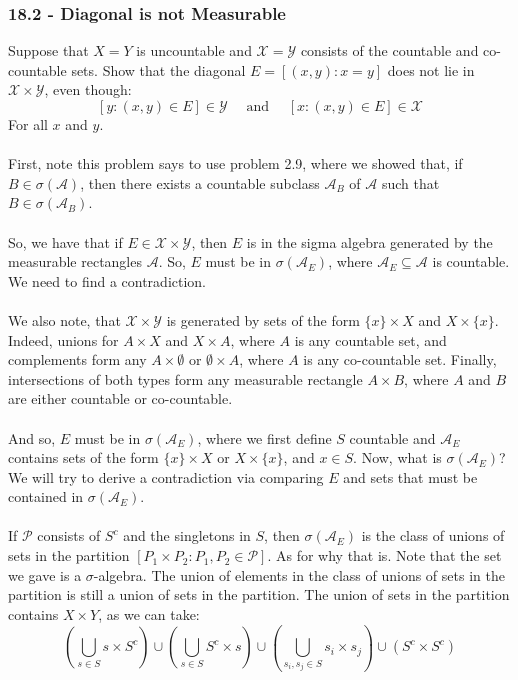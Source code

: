 \documentclass[12pt,a4paper]{article}
\newcommand{\1}[1]{\mathbbm{1}\left\{ #1 \right\}}
\newcommand{\acal}{\mathcal{A}}
\newcommand{\pcal}{\mathcal{P}}
\newcommand{\xcal}{\mathcal{X}}
\newcommand{\ycal}{\mathcal{Y}}
\begin{document}
\subsubsection{18.2 - Diagonal is not Measurable} Suppose that $X = Y$ is uncountable and $\xcal = \ycal$ consists of the countable and co-countable sets. Show that the diagonal $E = [(x,y) : x = y]$ does not lie in $\xcal \times \ycal$, even though:
$$
	[y : (x,y) \in E] \in \ycal
	\quad\text{ and }\quad
	[x : (x,y) \in E] \in \xcal
$$
For all $x$ and $y$.
\\\\
First, note this problem says to use problem 2.9, where we showed that, if $B \in \sigma(\acal)$, then there exists a countable subclass $\acal_B$ of $\acal$ such that $B \in \sigma(\acal_B)$.
\\\\
So, we have that if $E \in \xcal \times \ycal$, then $E$ is in the sigma algebra generated by the measurable rectangles $\acal$. So, $E$ must be in $\sigma(\acal_E)$, where $\acal_E \subseteq \acal$ is countable. We need to find a contradiction.
\\\\
We also note, that $\xcal \times \ycal$ is generated by sets of the form $\{x\} \times X$ and $X \times \{x\}$. Indeed, unions for $A \times X$ and $X \times A$, where $A$ is any countable set, and complements form any $A \times \emptyset$ or $\emptyset \times A$, where $A$ is any co-countable set. Finally, intersections of both types form any measurable rectangle $A \times B$, where $A$ and $B$ are either countable or co-countable.
\\\\
And so, $E$ must be in $\sigma(\acal_E)$, where we first define $S$ countable and $\acal_E$ contains sets of the form $\{x\} \times X$ or $X \times \{x\}$, and $x \in S$. Now, what is $\sigma(\acal_E)$? We will try to derive a contradiction via comparing $E$ and sets that must be contained in $\sigma(\acal_E)$.
\\\\
If $\pcal$ consists of $S^c$ and the singletons in $S$, then $\sigma(\acal_E)$ is the class of unions of sets in the partition $[P_1 \times P_2: P_1, P_2 \in \pcal]$. As for why that is. Note that the set we gave is a $\sigma$-algebra. The union of elements in the class of unions of sets in the partition is still a union of sets in the partition. The union of sets in the partition contains $X \times Y$, as we can take:
$$
	\left(\bigcup_{s \in S} s \times S^c\right) \cup
	\left(\bigcup_{s \in S} S^c \times s\right) \cup
	\left(\bigcup_{s_i, s_j \in S} s_i \times s_j\right) \cup
	\left(S^c \times S^c\right)
$$
\end{document}
